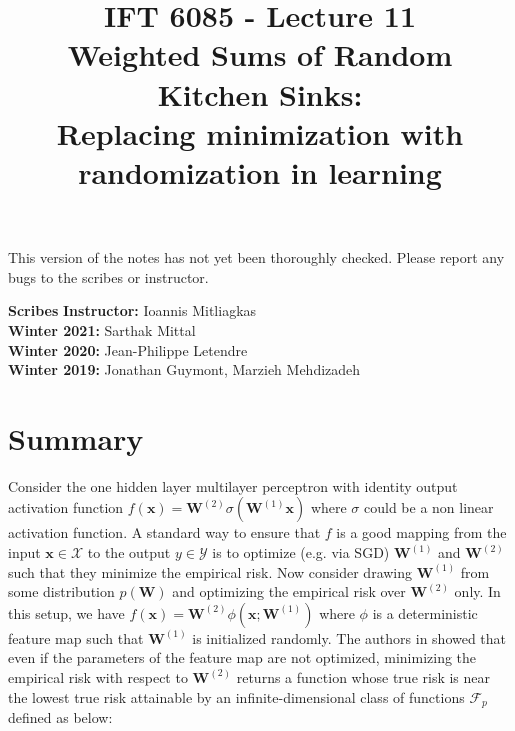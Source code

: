 \documentclass{article}
\title{
    IFT 6085 - Lecture 11 \\
    Weighted Sums of Random Kitchen Sinks:\\ Replacing minimization with randomization in learning
}
\date{}
\begin{document}
    \maketitle


    \vspace{-0.5in}


    \begin{center}
        This version of the notes has not yet been thoroughly checked.
        Please report any bugs to the scribes or instructor.
    \end{center}


    \vspace{0.2in}


    \textbf{Scribes}\hfill
    \textbf{Instructor:}  Ioannis Mitliagkas\\
    \textbf{Winter 2021:} Sarthak Mittal\\
    \textbf{Winter 2020:} Jean-Philippe Letendre\\
    \textbf{Winter 2019:} Jonathan Guymont, Marzieh Mehdizadeh\\


    \newcommand{\infgc}{\inf_{g \in \mathcal{C}}}
    \newcommand{\supgc}{\sup_{g \in \mathcal{C}}}

    \newcommand{\Prob}{\mathbb{P}}
    \newcommand{\E}{\mathbb{E}}
    \newcommand{\reals}{\mathbb{R}}
    \newcommand{\real}{\mathbb{R}}
    \newcommand{\nat}{\mathbb{N}}
    \newcommand{\der}{\mathrm{d}}
    \newcommand{\soft}{\mathrm{softmax}}


    \section{Summary}
    Consider the one hidden layer multilayer perceptron with identity output activation function $f(\mathbf{x})=\mathbf{W}^{(2)}\sigma(\mathbf{W}^{(1)}\mathbf{x})$ where $\sigma$ could be a non linear activation function. A standard way to ensure that $f$ is a good mapping from the input $\mathbf{x}\in \mathcal{X}$ to the output $y\in \mathcal{Y}$ is to optimize (e.g. via SGD) $\mathbf{W}^{(1)}$ and $\mathbf{W}^{(2)}$ such that they minimize the empirical risk. Now consider drawing $\mathbf{W}^{(1)}$ from some distribution $p(\mathbf{W})$ and optimizing the empirical risk over $\mathbf{W}^{(2)}$ only. In this setup, we have $f(\mathbf{x})=\mathbf{W}^{(2)}\phi(\mathbf{x};\mathbf{W}^{(1)})$ where $\phi$ is a deterministic feature map such that $\bm{W}^{(1)}$ is initialized randomly. The authors in \cite{NIPS2008_3495} showed that even if the parameters of the feature map are not optimized, minimizing the empirical risk with respect to $\mathbf{W}^{(2)}$ returns a  function whose true risk is near the lowest true risk attainable by an infinite-dimensional class of functions $\mathcal{F}_p$ defined as below:
\end{document}
